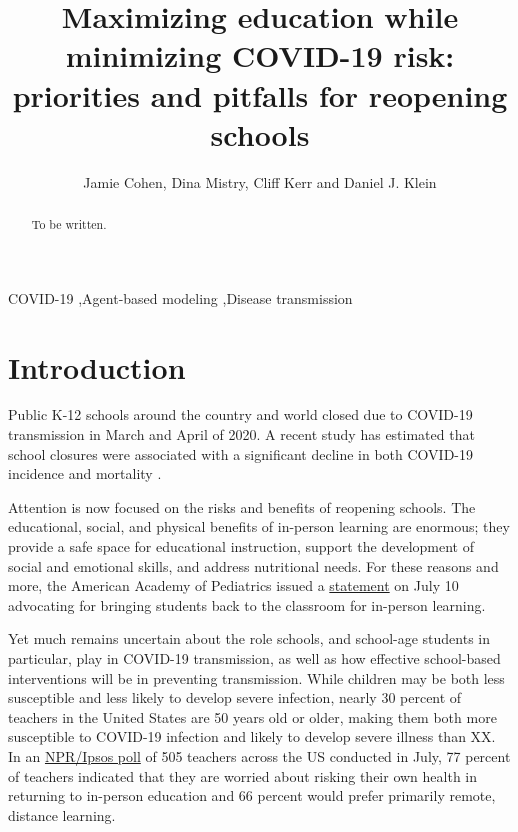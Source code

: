 \documentclass[preprint,12pt]{elsarticle}
\begin{document}
\begin{frontmatter}

\title{Maximizing education while minimizing COVID-19 risk: priorities and pitfalls for reopening schools}
\author{Jamie Cohen, Dina Mistry, Cliff Kerr and Daniel J. Klein}


\begin{abstract}
To be written.
\end{abstract}

\begin{keyword}
COVID-19 \sep Agent-based modeling \sep Disease transmission


\end{keyword}

\end{frontmatter}



\section{Introduction}

Public K-12 schools around the country and world closed due to COVID-19 transmission in March and April of 2020. A recent study has estimated that school closures were associated with a significant decline in both COVID-19 incidence and mortality \cite{auger_association_2020}. 

Attention is now focused on the risks and benefits of reopening schools. The educational, social, and physical benefits of in-person learning are enormous; they provide a safe space for educational instruction, support the development of social and emotional skills, and address nutritional needs. For these reasons and more, the American Academy of Pediatrics issued a \href{https://services.aap.org/en/news-room/news-releases/aap/2020/pediatricians-educators-and-superintendents-urge-a-safe-return-to-school-this-fall/}{statement} on July 10 advocating for bringing students back to the classroom for in-person learning. 

Yet much remains uncertain about the role schools, and school-age students in particular, play in COVID-19 transmission, as well as how effective school-based interventions will be in preventing transmission. While children may be both less susceptible and less likely to develop severe infection, nearly 30 percent of teachers in the United States are 50 years old or older, making them both more susceptible to COVID-19 infection and likely to develop severe illness than XX. In an \href{https://www.npr.org/2020/08/06/898584176/most-teachers-concerned-about-in-person-school-2-in-3-want-to-start-the-year-onl}{NPR/Ipsos poll} of 505 teachers across the US conducted in July, 77 percent of teachers indicated that they are worried about risking their own health in returning to in-person education and 66 percent would prefer primarily remote, distance learning.
\end{document}
